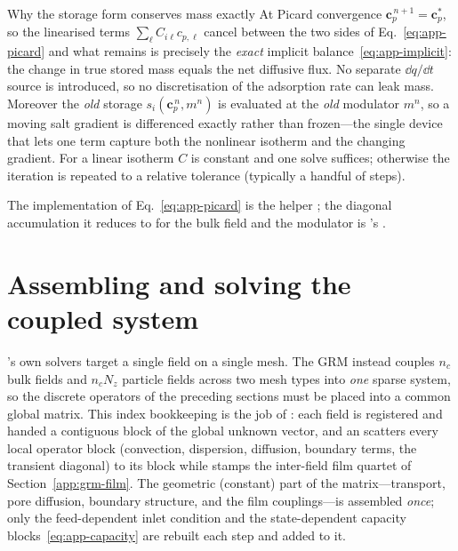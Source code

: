 \begin{keybox}{Why the storage form conserves mass exactly}
At Picard convergence $\bm c_p^{\,n+1}=\bm c_p^{*}$, so the linearised terms
$\sum_\ell C_{i\ell}c_{p,\ell}$ cancel between the two sides of
Eq.~\eqref{eq:app-picard} and what remains is precisely the \emph{exact} implicit
balance~\eqref{eq:app-implicit}: the change in true stored mass equals the net
diffusive flux. No separate $\dd q/\dd t$ source is introduced, so no
discretisation of the adsorption rate can leak mass. Moreover the \emph{old}
storage $s_i(\bm c_p^{\,n},m^{n})$ is evaluated at the \emph{old} modulator
$m^{n}$, so a moving salt gradient is differenced exactly rather than frozen---the
single device that lets one term capture both the nonlinear isotherm and the
changing gradient. For a linear isotherm $C$ is constant and one solve suffices;
otherwise the iteration is repeated to a relative tolerance (typically a handful
of steps).
\end{keybox}

The implementation of Eq.~\eqref{eq:app-picard} is the helper
; the diagonal accumulation it reduces to for
the bulk field and the modulator is 's .

\section{Assembling and solving the coupled system}
\label{app:grm-assembly}

's own solvers target a single field on a single mesh. The GRM
instead couples $n_c$ bulk fields and $n_c N_z$ particle fields across two mesh
types into \emph{one} sparse system, so the discrete operators of the preceding
sections must be placed into a common global matrix. This index bookkeeping is the
job of : each field is registered and handed a
contiguous block of the global unknown vector, and an  scatters
every local operator block (convection, dispersion, diffusion, boundary terms,
the transient diagonal) to its block while  stamps the inter-field
film quartet of Section~\ref{app:grm-film}. The geometric (constant) part of the
matrix---transport, pore diffusion, boundary structure, and the film
couplings---is assembled \emph{once}; only the feed-dependent inlet condition and
the state-dependent capacity blocks~\eqref{eq:app-capacity} are rebuilt each step
and added to it.


